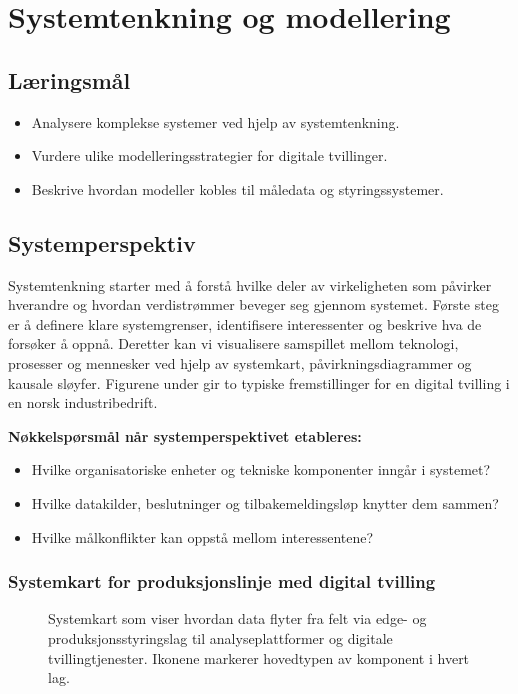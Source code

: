 \chapter{Systemtenkning og modellering}


\section{Læringsmål}
\begin{itemize}
    \item Analysere komplekse systemer ved hjelp av systemtenkning.
    \item Vurdere ulike modelleringsstrategier for digitale tvillinger.
    \item Beskrive hvordan modeller kobles til måledata og styringssystemer.
\end{itemize}

\section{Systemperspektiv}
Systemtenkning starter med å forstå hvilke deler av virkeligheten som påvirker hverandre og hvordan verdistrømmer beveger seg gjennom systemet. Første steg er å definere klare systemgrenser, identifisere interessenter og beskrive hva de forsøker å oppnå. Deretter kan vi visualisere samspillet mellom teknologi, prosesser og mennesker ved hjelp av systemkart, påvirkningsdiagrammer og kausale sløyfer. Figurene under gir to typiske fremstillinger for en digital tvilling i en norsk industribedrift.

\textbf{Nøkkelspørsmål når systemperspektivet etableres:}
\begin{itemize}
    \item Hvilke organisatoriske enheter og tekniske komponenter inngår i systemet?
    \item Hvilke datakilder, beslutninger og tilbakemeldingsløp knytter dem sammen?
    \item Hvilke målkonflikter kan oppstå mellom interessentene?
\end{itemize}

\subsection{Systemkart for produksjonslinje med digital tvilling}
\begin{figure}[ht]
    \centering
    \resizebox{\textwidth}{!}{}
    \caption{Systemkart som viser hvordan data flyter fra felt via edge- og produksjonsstyringslag til analyseplattformer og digitale tvillingtjenester. Ikonene markerer hovedtypen av komponent i hvert lag.}
    \label{fig:kap02-systemkart}
\end{figure}

